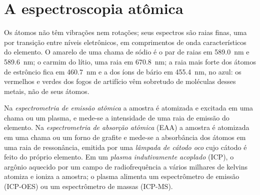 \section{A espectroscopia atômica}

Os átomos não têm vibrações nem rotações; seus espectros são raias finas, uma por transição entre níveis
eletrônicos, em comprimentos de onda característicos do elemento. O amarelo de uma chama de sódio é o
par de raias em \qty{589.0}{nm} e \qty{589.6}{nm}; o carmim do lítio, uma raia em \qty{670.8}{nm};
a raia mais forte dos átomos de estrôncio fica em \qty{460.7}{nm} e a dos íons de bário em
\qty{455.4}{nm}, no azul: os vermelhos e verdes dos fogos de artifício vêm sobretudo de moléculas desses
metais, não de seus átomos.

\begin{definition}\label{def:b2:mass-spec-atomic:atomic}
Na \emph{espectrometria de emissão atômica} a amostra é atomizada e
excitada em uma chama ou um plasma, e mede-se a intensidade de uma raia de emissão do elemento. Na
\emph{espectrometria de absorção atômica} (EAA) a amostra é
atomizada em uma chama ou um forno de grafite e mede-se a absorbância dos átomos em uma raia de
ressonância, emitida por uma \emph{lâmpada de cátodo oco} cujo cátodo é feito do
próprio elemento. Em um \emph{plasma indutivamente acoplado} (ICP), o argônio
aquecido por um campo de radiofrequência a vários milhares de kelvins atomiza e ioniza a amostra; o
plasma alimenta um espectrômetro de emissão (ICP-OES) ou um espectrômetro de massas (ICP-MS).
\end{definition}

